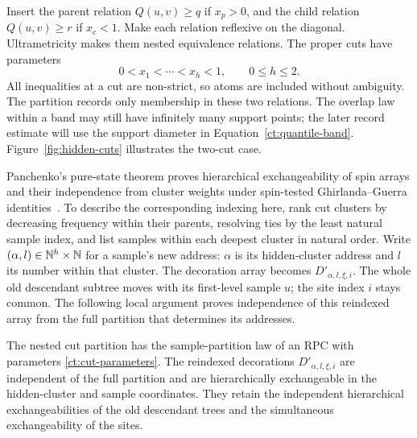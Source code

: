 Insert the parent relation $Q(u,v)\ge q$ if $x_p>0$, and the child
relation $Q(u,v)\ge r$ if $x_c<1$.  Make each relation reflexive on
the diagonal.  Ultrametricity makes them nested equivalence
relations.  The proper cuts have parameters
\begin{equation}\label{ct:cut-parameters}
                       0<x_1<\cdots<x_h<1,
                       \qquad 0\le h\le2.
\end{equation}
All inequalities at a cut are non-strict, so atoms are included
without ambiguity.
The partition records only membership in these two relations.  The
overlap law within a band may still have infinitely many support points;
the later record estimate will use the support diameter in
Equation~\eqref{ct:quantile-band}.
Figure~\ref{fig:hidden-cuts} illustrates the two-cut case.


Panchenko's pure-state theorem proves hierarchical exchangeability of spin
arrays and their independence from cluster weights under spin-tested
Ghirlanda--Guerra identities~\cite[Theorem~1]{Panchenko2015HE}.
To describe the corresponding indexing here, rank cut clusters by decreasing
frequency within their parents, resolving ties by the least natural sample
index, and list samples within each deepest cluster in natural order.
Write $(\alpha,l)\in\mathbb N^h\times\mathbb N$ for a sample's new address: $\alpha$
is its hidden-cluster address and $l$ its number within that cluster.
The decoration array becomes $D'_{\alpha,l,\xi,i}$. The whole old
descendant subtree moves with its first-level sample $u$; the site index
$i$ stays common. The following local argument proves independence of
this reindexed array from the full partition that determines its addresses.

\FloatBarrier
\begin{lemma}\label{ct:marked-cuts}
The nested cut partition has the sample-partition law of an RPC with
parameters \eqref{ct:cut-parameters}. The reindexed decorations
$D'_{\alpha,l,\xi,i}$ are independent of the full partition and are
hierarchically exchangeable in the hidden-cluster and sample coordinates.
They retain the independent hierarchical exchangeabilities of the old
descendant trees and the simultaneous exchangeability of the sites.
\end{lemma}

